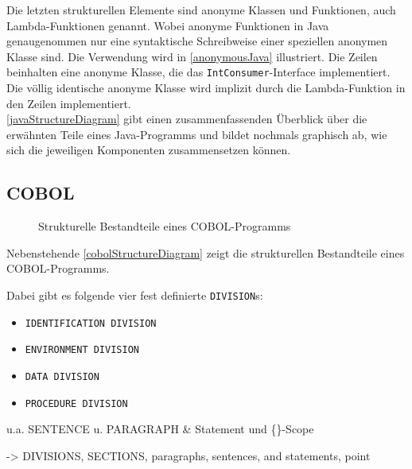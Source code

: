 
Die letzten strukturellen Elemente sind anonyme Klassen und Funktionen, auch Lambda-Funktionen genannt. Wobei anonyme Funktionen in Java genaugenommen nur eine syntaktische Schreibweise einer speziellen anonymen Klasse sind. Die Verwendung wird in \autoref{anonymousJava} illustriert. Die Zeilen  beinhalten eine anonyme Klasse, die das \texttt{IntConsumer}-Interface implementiert. Die völlig identische  anonyme Klasse wird implizit durch die Lambda-Funktion in den Zeilen  implementiert.\\

\autoref{javaStructureDiagram} gibt einen zusammenfassenden Überblick über die erwähnten Teile eines Java-Programms und bildet nochmals graphisch ab, wie sich die jeweiligen Komponenten zusammensetzen können.\\

\subsection*{COBOL}
{

\begin{wrapfigure}{l}{.5\textwidth}
\centering

\caption{Strukturelle Bestandteile eines COBOL-Programms\label{cobolStructureDiagram}}
\end{wrapfigure}
Nebenstehende \autoref{cobolStructureDiagram} zeigt die strukturellen Bestandteile eines COBOL-Programms. 

Dabei gibt es folgende vier fest definierte \texttt{DIVISION}s:
\begin{itemize}
    \item \texttt{IDENTIFICATION DIVISION}
    \item \texttt{ENVIRONMENT DIVISION}
    \item \texttt{DATA DIVISION}
    \item \texttt{PROCEDURE DIVISION}
\end{itemize}


u.a. SENTENCE u. PARAGRAPH \& Statement und \{\}-Scope

-> DIVISIONS, SECTIONS, paragraphs, sentences, and statements, point

}



